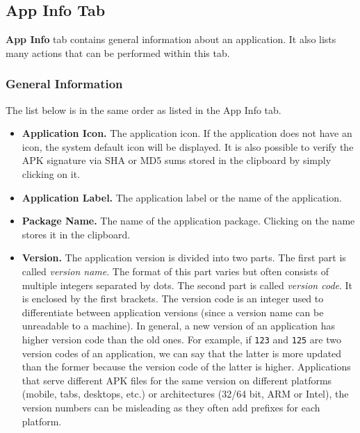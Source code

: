 \subsection{App Info Tab}\label{subsec:app-info-tab} %
\textbf{App Info} tab contains general information about an application. It also lists many actions that can be
performed within this tab.

\subsubsection{General Information}\label{subsubsec:app-info-general-information} %
The list below is in the same order as listed in the App Info tab.
\begin{itemize}
    \item \textbf{Application Icon.} The application icon. If the application does not have an icon, the system default
    icon will be displayed. It is also possible to verify the APK signature via SHA or MD5 sums stored in the clipboard
    by simply clicking on it.

    \item \textbf{Application Label.} The application label or the name of the application.

    \item \textbf{Package Name.} The name of the application package. Clicking on the name stores it in the clipboard.

    \item \textbf{Version.} The application version is divided into two parts. The first part is called \textit{version
    name}. The format of this part varies but often consists of multiple integers separated by dots. The second part
    is called \textit{version code}. It is enclosed by the first brackets. The version code is an integer used to
    differentiate between application versions (since a version name can be unreadable to a machine). In general,
    a new version of an application has higher version code than the old ones. For example, if \texttt{123} and
    \texttt{125} are two version codes of an application, we can say that the latter is more updated than the former
    because the version code of the latter is higher. Applications that serve different APK files for the same version
    on different platforms (mobile, tabs, desktops, etc.) or architectures (32/64 bit, ARM or Intel), the version
    numbers can be misleading as they often add prefixes for each platform.


\end{itemize}
